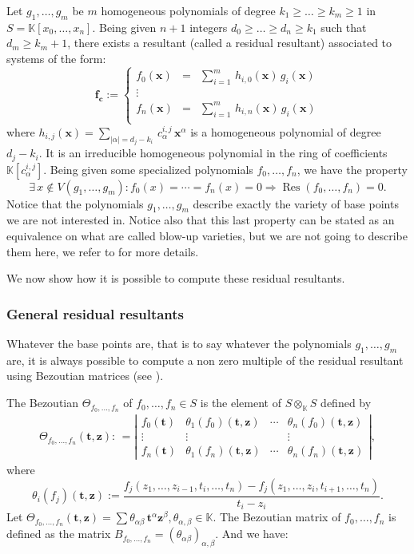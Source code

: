 \documentclass[10pt]{amsart}
\theoremstyle{plain}
\theoremstyle{definition}
\def\KK{{\mathbb{K}}}
\def\c{{\mathbf{c}}}
\def\f{{\mathbf{f}}}
\def\x{\mathbf{x}}
\def\t{\mathbf{t}}
\def\z{\mathbf{z}}
\def\a{\alpha}
\def\b{\beta}
\DeclareMathOperator\Res{Res}
\begin{document}
Let $g_{1},\ldots,g_{m}$ be $m$ homogeneous polynomials of degree $k_1
\geq \ldots \geq k_m\geq 1$ in $S=\KK[x_0,\ldots,x_n]$. Being given
$n+1$ integers $d_{0} \geq \ldots \geq d_{n}\geq k_1$ such that
$d_m\geq k_m+1$, there exists a resultant (called a residual resultant) associated to systems of the form:
\begin{equation}\label{FGH}
\f_{\c}:=
\left\{
\begin{array}{rcl}
f_{0}(\x) & = &  \sum_{i=1}^{m}\, h_{i,0}(\x)\, g_{i}(\x) \\
\vdots   \\
f_{n}(\x) & = &  \sum_{i=1}^{m}\, h_{i,n}(\x)\, g_{i}(\x) \\
\end{array} 
\right.
\end{equation}
where $h_{i,j}(\x)=\sum_{|\alpha|=d_{j}-k_{i}} \, c^{i,j}_{\alpha}\,
\x^{\alpha}$ is a homogeneous polynomial of degree $d_{j}-k_{i}$. It is an irreducible homogeneous polynomial in the ring of coefficients $\KK[c^{i,j}_{\alpha}]$. Being given some specialized polynomials $f_0,\ldots,f_n$, we have the property
$$
 \exists\,  x\notin V(g_1,\ldots,g_m) : f_0(x)=\cdots=f_n(x)=0 \Rightarrow \Res(f_0,\ldots,f_n)=0.
$$
Notice that the polynomials $g_1,\ldots,g_m$ describe exactly the variety of base points we are not interested in. Notice also that this last property can be stated as an equivalence on what are called blow-up varieties, but we are not going to describe them here, we refer to \cite{BEM01,BusPhD} for more details. 

We now show how it is possible to compute these residual resultants.

\subsubsection{General residual resultants}

Whatever the base points are, that is to say whatever the polynomials
$g_1,\ldots,g_m$ are, it is always possible to compute a non zero multiple of
the residual resultant using Bezoutian matrices (see
\cite{BEM00,BusPhD}).


The Bezoutian $\Theta_{f_0,\ldots,f_n}$ of $f_{0},\ldots, f_{n} \in S$
is the element of $S \otimes_{\KK} S$ defined by
\begin{eqnarray*}
\Theta_{f_0,\ldots,f_n}(\t,\z) {:\,\!=}  
{\left|
\begin{array}{cccc}
f_0(\t) & \theta_1(f_0)(\t,\z) & \cdots & \theta_n(f_0)(\t,\z) \\
\vdots & \vdots          &  &  \vdots         \\
f_n(\t) & \theta_1(f_n)(\t,\z) & \cdots & \theta_n(f_n)(\t,\z) 
\end{array}       \right|} ,
\end{eqnarray*} 
where
$$
\theta_i(f_j)(\t,\z):=\frac{f_j(z_1,\ldots,z_{i-1},t_{i},\ldots,t_n)-
  f_j(z_1,\ldots,z_{i},t_{i+1},\ldots,t_n)}{t_i-z_i} .
$$
Let $ \Theta_{f_{0},\ldots,f_n}(\t,\z)= \sum \theta_{\a\b}\,
\t^{\a}\z^{\b}, \theta_{\a,\b} \in \KK$. The Bezoutian matrix of
$f_{0},\ldots,f_{n}$ is defined as the matrix $B_{f_{0},\ldots,f_{n}} =
(\theta_{\a\b})_{\a , \b}$. And we have:
\end{document}
